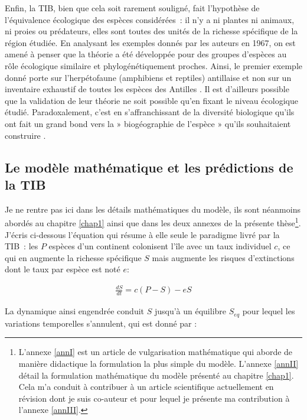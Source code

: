 Enfin, la TIB, bien que cela soit rarement souligné, fait l'hypothèse de
l'équivalence écologique des espèces considérées~: il n'y a ni plantes
ni animaux, ni proies ou prédateurs, elles sont toutes des unités de la
richesse spécifique de la région étudiée. En analysant les exemples
donnés par les auteurs en 1967, on est amené à penser que la théorie a
été développée pour des groupes d'espèces au rôle écologique similaire
et phylogénétiquement proches. Ainsi, le premier exemple donné porte sur
l'herpétofaune (amphibiens et reptiles) antillaise et non sur un
inventaire exhaustif de toutes les espèces des Antilles
\citep{MacArthur1967}. Il est d'ailleurs possible que la validation de
leur théorie ne soit possible qu'en fixant le niveau écologique étudié.
Paradoxalement, c'est en s'affranchissant de la diversité biologique
qu'ils ont fait un grand bond vers la » biogéographie de l'espèce »
qu'ils souhaitaient construire \citep[ p.183]{MacArthur1967}.

\subsection*{Le modèle mathématique et les prédictions de la
TIB}\label{le-moduxe8le-mathuxe9matique-et-les-pruxe9dictions-de-la-tib}

Je ne rentre pas ici dans les détails mathématiques du modèle, ils sont
néanmoins abordés au chapitre \ref{chap1} ainsi que dans les deux
annexes de la présente thèse\footnote{L'annexe \ref{annI} est un article
  de vulgarisation mathématique qui aborde de manière didactique la
  formulation la plus simple du modèle. L'annexe \ref{annII} détail la
  formulation mathématique du modèle présenté au chapitre \ref{chap1}.
  Cela m'a conduit à contribuer à un article scientifique actuellement
  en révision dont je suis co-auteur et pour lequel je présente ma
  contribution à l'annexe \ref{annIII}.}. J'écris ci-dessous l'équation
qui résume à elle seule le paradigme livré par la TIB~: les \(P\)
espèces d'un continent colonisent l'île avec un taux individuel \(c\),
ce qui en augmente la richesse spécifique \(S\) mais augmente les
risques d'extinctions dont le taux par espèce est noté \(e\):

\begin{eqnarray}
\label{eqMW}
\frac{dS}{dt} = c(P-S)-eS
\end{eqnarray}

La dynamique ainsi engendrée conduit \(S\) jusqu'à un équilibre
\(S_{eq}\) pour lequel les variations temporelles s'annulent, qui est
donné par :


